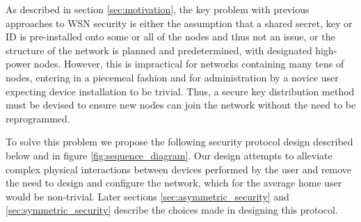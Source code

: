 \documentclass[conference]{./sty/IEEEtran}
\begin{document}
As described in section \ref{sec:motivation}, the key problem with previous approaches to WSN security is either the assumption that a shared secret, key or ID is pre-installed onto some or all of the nodes and thus not an issue, or the structure of the network is planned and predetermined, with designated high-power nodes. However, this is impractical for networks containing many tens of nodes, entering in a piecemeal fashion and for administration by a novice user expecting device installation to be trivial. Thus, a secure key distribution method must be devised to ensure new nodes can join the network without the need to be reprogrammed.

To solve this problem we propose the following security protocol design described below and in figure \ref{fig:sequence_diagram}. Our design attempts to alleviate complex physical interactions between devices performed by the user\cite{MessageBottle} and remove the need to design and configure the network, which for the average home user would be non-trivial. Later sections \ref{sec:asymmetric_security} and \ref{sec:symmetric_security} describe the choices made in designing this protocol.
\end{document}
